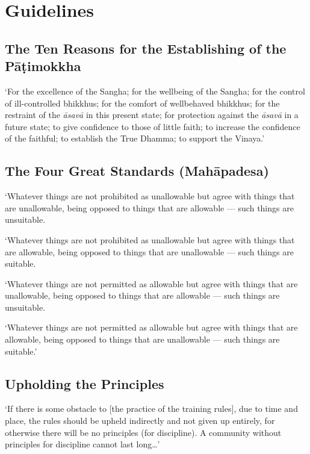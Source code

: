 \chapter{Guidelines}

\section{The Ten Reasons for the Establishing of the Pāṭimokkha}

`For the excellence of the Sangha; for the wellbeing of the Sangha; for the
control of ill-controlled bhikkhus; for the comfort of wellbehaved bhikkhus; for
the restraint of the \emph{āsavā} in this present state; for protection against
the \emph{āsavā} in a future state; to give confidence to those of little faith;
to increase the confidence of the faithful; to establish the True Dhamma; to
support the Vinaya.'


\section{The Four Great Standards (Mahāpadesa)}

`Whatever things are not prohibited as unallowable but agree with things that
are unallowable, being opposed to things that are allowable — such things are
unsuitable.

`Whatever things are not prohibited as unallowable but agree with things that
are allowable, being opposed to things that are unallowable — such things are
suitable.

`Whatever things are not permitted as allowable but agree with things that are
unallowable, being opposed to things that are allowable — such things are
unsuitable.

`Whatever things are not permitted as allowable but agree with things that are
allowable, being opposed to things that are unallowable — such things are
suitable.'


\section{Upholding the Principles}

`If there is some obstacle to [the practice of the training rules], due to time
and place, the rules should be upheld indirectly and not given up entirely, for
otherwise there will be no principles (for discipline). A community without
principles for discipline cannot last long\ldots{}'


